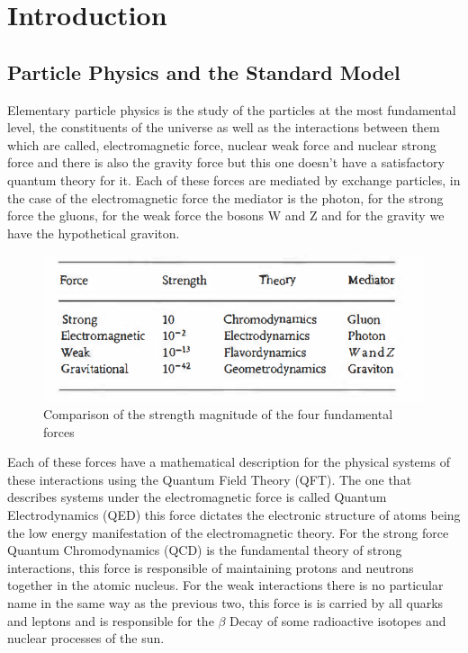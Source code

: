 \chapter{Introduction}
\label{ch1}



\section{Particle Physics and the Standard Model}

Elementary particle physics is the study of the particles at the most fundamental level, the constituents of the universe as well as the interactions between them which are called, electromagnetic force, nuclear weak force and nuclear strong force and there is also the gravity force but this one doesn't have a satisfactory quantum theory for it. Each of these forces are mediated by exchange particles, in the case of the electromagnetic force the mediator is the photon, for the strong force the gluons, for the weak force the bosons W and Z and for the gravity we have the hypothetical graviton.  \cite{Griff}  

\begin{figure}[h]
    \centering
    \includegraphics[scale=1]{table1.png}
    \caption{Comparison of the strength magnitude of the four fundamental forces}
    \label{fig:four-forces}
\end{figure}

Each of these forces have a mathematical description for the physical systems of these interactions using the Quantum Field Theory (QFT). The one that describes systems under the electromagnetic force is called Quantum Electrodynamics (QED) this force dictates the electronic structure of atoms being the low energy manifestation of the electromagnetic theory. For the strong force Quantum Chromodynamics (QCD) is the fundamental theory of strong interactions, this force is responsible of maintaining protons and neutrons together in the atomic nucleus. For the weak interactions there is no particular name in the same way as the previous two, this force is is carried by all quarks and leptons and is responsible for the $\beta$ Decay of some radioactive isotopes and nuclear processes of the sun. \cite{mppthomson}   


